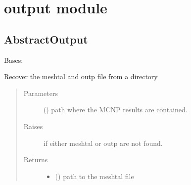 \documentclass[letterpaper,10pt,english]{sphinxmanual}
\begin{document}
\section{output module}
\label{\detokenize{api/postprocessing:output-module}}

\subsection{AbstractOutput}
\label{\detokenize{api/postprocessing:abstractoutput}}\label{\detokenize{api/postprocessing:abstractoutputob}}

\begin{fulllineitems}
\label{\detokenize{api/postprocessing:output.AbstractOutput}}
\sphinxAtStartPar
Bases: 

\begin{fulllineitems}
\label{\detokenize{api/postprocessing:output.AbstractOutput._get_output_files}}
\sphinxAtStartPar
Recover the meshtal and outp file from a directory
\begin{quote}\begin{description}
\item[{Parameters}] \leavevmode
\sphinxAtStartPar
{} () \textendash{} path where the MCNP results are contained.

\item[{Raises}] \leavevmode
\sphinxAtStartPar
{} \textendash{} if either meshtal or outp are not found.

\item[{Returns}] \leavevmode
\sphinxAtStartPar
\begin{itemize}
\item {} 
\sphinxAtStartPar
{} () \textendash{} path to the meshtal file


\end{itemize}
\end{description}
\end{quote}
\end{fulllineitems}
\end{fulllineitems}
\end{document}
